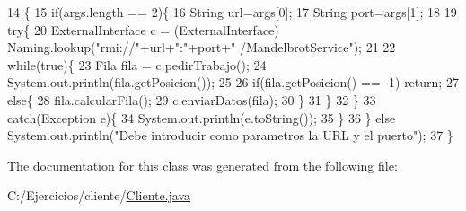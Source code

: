 \begin{DoxyCode}
14                                           \{
15         \textcolor{keywordflow}{if}(args.length == 2)\{
16             String url=args[0];
17             String port=args[1];
18             
19             \textcolor{keywordflow}{try}\{
20                 ExternalInterface c = (ExternalInterface) Naming.lookup(\textcolor{stringliteral}{"rmi://"}+url+\textcolor{stringliteral}{":"}+port+\textcolor{stringliteral}{"
      /MandelbrotService"});
21                 
22                 \textcolor{keywordflow}{while}(\textcolor{keyword}{true})\{
23                     Fila fila = c.pedirTrabajo();
24                     System.out.println(fila.getPosicion());
25                     
26                     \textcolor{keywordflow}{if}(fila.getPosicion() == -1) \textcolor{keywordflow}{return};
27                     \textcolor{keywordflow}{else}\{
28                         fila.calcularFila();
29                         c.enviarDatos(fila);
30                     \}
31                 \}
32             \}
33             \textcolor{keywordflow}{catch}(Exception e)\{
34                 System.out.println(e.toString());
35             \}
36         \} \textcolor{keywordflow}{else} System.out.println(\textcolor{stringliteral}{"Debe introducir como parametros la URL y el puerto"});
37     \}
\end{DoxyCode}


The documentation for this class was generated from the following file\+:\begin{DoxyCompactItemize}
\item 
C\+:/\+Ejercicios/cliente/\hyperlink{Cliente_8java}{Cliente.\+java}\end{DoxyCompactItemize}
